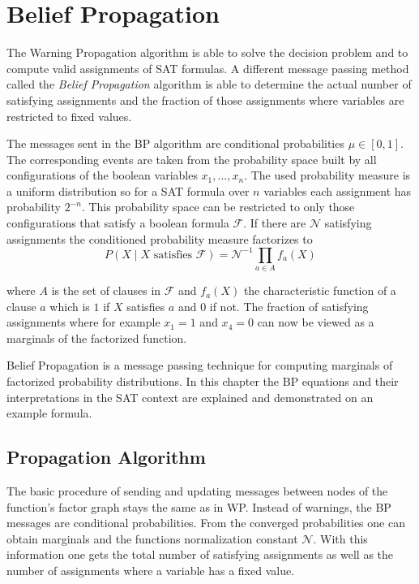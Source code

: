 \section{Belief Propagation} \label{BP}

The Warning Propagation algorithm is able to solve the decision problem and to compute valid assignments of SAT formulas. A different message passing method called the \emph{Belief Propagation} algorithm is able to determine the actual number of satisfying assignments and the fraction of those assignments where variables are restricted to fixed values. 

The messages sent in the BP algorithm are conditional probabilities $\mu \in [0, 1]$. The corresponding events are taken from the probability space built by all configurations of the  boolean variables $x_1, \ldots, x_n$. The used probability measure is a uniform distribution so for a SAT formula over $n$ variables each assignment has probability $2^{-n}$. \newline
This probability space can be restricted to only those configurations that satisfy a boolean formula $\mathcal{F}$. If there are $\mathcal{N}$ satisfying assignments the conditioned probability measure factorizes to $$P(X \; | \; X \text{ satisfies } \mathcal{F}) = \mathcal{N}^{-1} \prod_{a \in A} f_a(X)$$

where $A$ is the set of clauses in $\mathcal{F}$ and $f_a(X)$ the characteristic function of a clause $a$ which is $1$ if $X$ satisfies $a$ and $0$ if not. \newline
The fraction of satisfying assignments where for example $x_1 = 1$ and $x_4 = 0$ can now be viewed as a marginals of the factorized function. \newline

 Belief Propagation is a message passing technique for computing marginals of  factorized probability distributions. In this chapter the BP equations and their interpretations in the SAT context are explained and demonstrated on an example formula.

\subsection{Propagation Algorithm} \label{BPA}

The basic procedure of sending and updating messages between nodes of the function's factor graph stays the same as in WP. Instead of warnings, the BP messages are conditional probabilities. From the converged probabilities one can obtain marginals and the functions normalization constant $\mathcal{N}$. With this information one gets the total number of satisfying assignments as well as the number of assignments where a variable has a fixed value.


